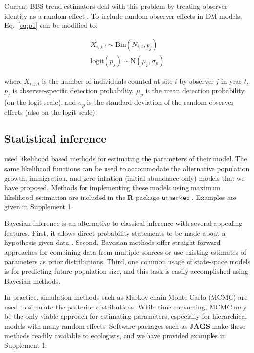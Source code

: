 \documentclass[12pt,english]{article}
\begin{document}
\begin{spacing}{1.9}
\begin{flushleft}
Current BBS trend estimators deal with this problem by
treating observer identity as a random 
effect \citep{link_sauer:2002,sauer_link:2011}.
To include random observer effects in DM models, 
Eq.~\ref{eq:p1} can be modified to:
\begin{linenomath*}
\begin{gather}
X_{i,j,t} \sim \mathrm{Bin}(N_{i,t}, p_j) \nonumber \\
\mathrm{logit}(p_j) \sim \mathrm{N}(\mu_p, \sigma_p)
\label{eq:pobs}
\end{gather}
\end{linenomath*}
where $X_{i,j,t}$ is the number of individuals counted at site $i$ by
observer $j$ in year $t$, $p_j$ is observer-specific detection probability,
$\mu_p$ is the mean detection probability (on the logit scale), and $\sigma_p$ is
the standard deviation of the random observer effects (also on the logit scale). 

\subsection*{Statistical inference}

\citet{dail_madsen:2011} used likelihood based methods for estimating
the parameters of their model. The same likelihood functions can be
used to accommodate the alternative population growth, immigration, and 
zero-inflation (initial abundance only) models that we
have proposed. Methods for implementing these models using maximum 
likelihood estimation are included in the 
\textbf{R} package \texttt{unmarked} \citep{fiske_chandler:2011}. Examples
are given in Supplement 1.

Bayesian inference is an alternative to classical inference with
several appealing features. First, it allows direct probability
statements to be made about a hypothesis given data
\citep{link_barker:2010}.  Second, Bayesian methods offer
straight-forward approaches for combining data from multiple sources
or use existing estimates of parameters as prior distributions. Third,
one common usage of state-space models is for predicting future
population size, and this task is easily accomplished using Bayesian
methods.

In
practice, simulation methods such as Markov chain Monte Carlo (MCMC)
are used to simulate the posterior distributions. While time
consuming, MCMC may be the only viable approach for estimating
parameters, especially for hierarchical models with many random
effects.  
Software packages such as 
\textbf{JAGS} \citep{plummer:2003} make these methods readily
available to ecologists, and we have provided examples in 
Supplement 1. 



\end{flushleft}
\end{spacing}
\end{document}
